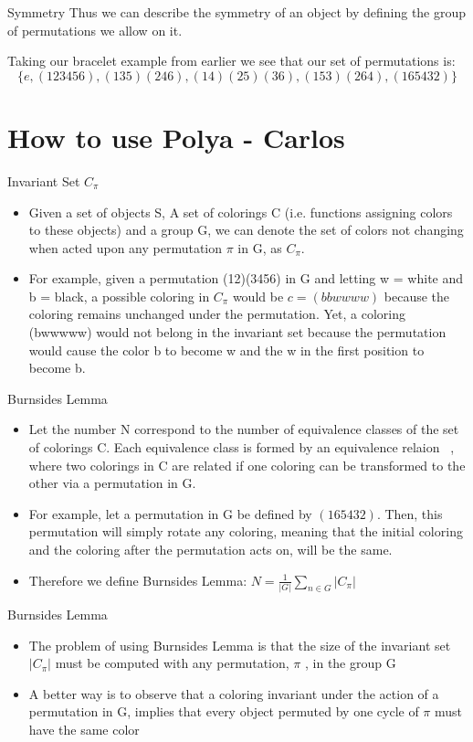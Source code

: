 \documentclass{beamer}
\begin{document}
\begin{frame}{Symmetry}
	Thus we can describe the symmetry of an object by defining the group of permutations we allow on it.

  Taking our bracelet example from earlier we see that our set of permutations is:
  \[\{e,(123456),(135)(246),(14)(25)(36),(153)(264),(165432)\}\]
\end{frame}
\section{How to use Polya - Carlos}

\begin{frame}{Invariant Set $C_{\pi}$}
\begin{itemize}
\item Given a set of objects S, A set of colorings C (i.e. functions assigning colors to these objects) and a group G, we can denote the set of colors not changing when acted upon any permutation ${\pi}$ in G, as $C_{\pi}$.
\item For example, given a permutation (12)(3456) in G and letting w = white and b = black, a possible coloring in $C_{\pi}$ would be $c =(bbwwww)$ because the coloring remains unchanged under the permutation. Yet, a coloring (bwwwww) would not belong in the invariant set because the permutation would cause the color b to become w and the w in the first position to become b.
\end{itemize}
\end{frame}
%
%
\begin{frame}{Burnsides Lemma}
\begin{itemize}
\item Let the number N correspond to the number of equivalence classes of the set of colorings C. Each equivalence class is formed by an equivalence relaion ~, where two colorings in C are related if one coloring can be  transformed to the other via a permutation in G.
\item For example, let a permutation in G be defined by $(165432)$. Then, this permutation will simply rotate any coloring, meaning that the initial coloring and the coloring after the permutation acts on, will be the same.
\item Therefore we define Burnsides Lemma: $N=\frac{1}{\vert G\vert}{\displaystyle \sum_{n\in G}\vert C_{\pi}\vert}$
\end{itemize}
\end{frame}
%
%
\begin{frame}{Burnsides Lemma}
\begin{itemize}
\item The problem of using Burnsides Lemma is that the size of the invariant set $\vert C_{\pi}\vert$ must be computed with any permutation, $\pi$ , in the group G
\item A better way is to observe that a coloring invariant under the action of a permutation in G, implies that every object permuted by one cycle of $\pi$ must have the same color
\end{itemize}
\end{frame}
\end{document}
